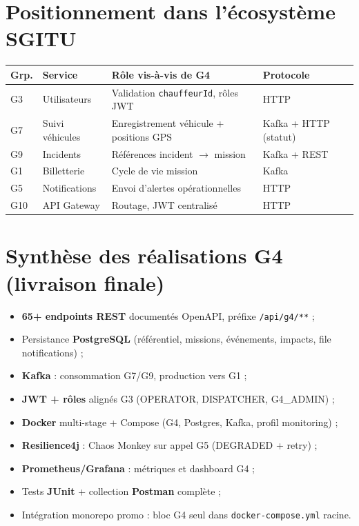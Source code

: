 \documentclass[12pt,a4paper]{report}
\begin{document}
\section{Positionnement dans l'écosystème SGITU}
\begin{center}
\small
\begin{tabular}{@{}p{1.2cm}p{3.2cm}p{5.5cm}p{2.2cm}@{}}
\toprule
\textbf{Grp.} & \textbf{Service} & \textbf{Rôle vis-à-vis de G4} & \textbf{Protocole} \\
\midrule
G3 & Utilisateurs & Validation \texttt{chauffeurId}, rôles JWT & HTTP \\
G7 & Suivi véhicules & Enregistrement véhicule + positions GPS & Kafka + HTTP (statut) \\
G9 & Incidents & Références incident $\rightarrow$ mission & Kafka + REST \\
G1 & Billetterie & Cycle de vie mission & Kafka \\
G5 & Notifications & Envoi d'alertes opérationnelles & HTTP \\
G10 & API Gateway & Routage, JWT centralisé & HTTP \\
\bottomrule
\end{tabular}
\end{center}

\section{Synthèse des réalisations G4 (livraison finale)}
\begin{tcolorbox}[colback=ensablue!5, colframe=ensablue, title=\textbf{Travaux livrés}]
\begin{itemize}[leftmargin=*]
    \item \textbf{65+ endpoints REST} documentés OpenAPI, préfixe \texttt{/api/g4/**} ;
    \item Persistance \textbf{PostgreSQL} (référentiel, missions, événements, impacts, file notifications) ;
    \item \textbf{Kafka} : consommation G7/G9, production vers G1 ;
    \item \textbf{JWT + rôles} alignés G3 (OPERATOR, DISPATCHER, G4\_ADMIN) ;
    \item \textbf{Docker} multi-stage + Compose (G4, Postgres, Kafka, profil monitoring) ;
    \item \textbf{Resilience4j} : Chaos Monkey sur appel G5 (DEGRADED + retry) ;
    \item \textbf{Prometheus/Grafana} : métriques et dashboard G4 ;
    \item Tests \textbf{JUnit} + collection \textbf{Postman} complète ;
    \item Intégration monorepo promo : bloc G4 seul dans \texttt{docker-compose.yml} racine.
\end{itemize}
\end{tcolorbox}
\end{document}
